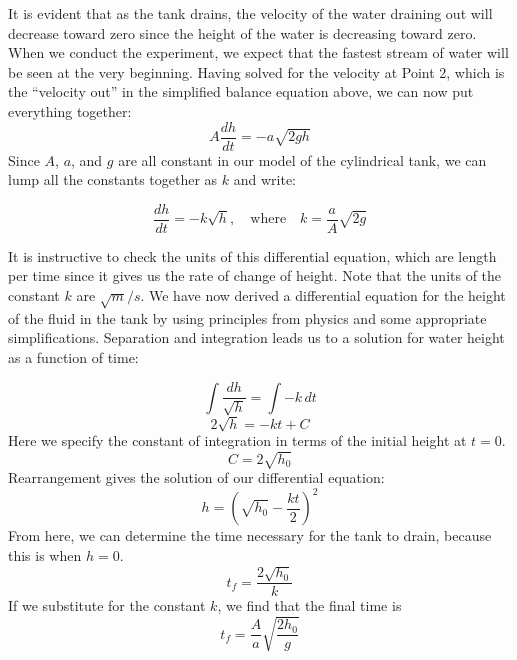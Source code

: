 \documentclass{ximera}
\begin{document}
 It is evident that as the tank drains, the velocity of the water draining out will decrease toward zero since the height of the water is decreasing toward zero.  When we conduct the experiment, we expect that the fastest stream of water will be seen at the very beginning.  Having solved for the velocity at Point 2, which is the “velocity out” in the simplified balance equation above, we can now put everything together:
 $$A\frac{dh}{dt}=-a\sqrt{2gh}$$
 Since $A$, $a$, and $g$ are all constant in our model of the cylindrical tank, we can lump all the constants together as $k$ and write:
 
 $$\frac{dh}{dt}=-k\sqrt{h},\quad \text{where}\quad k=\frac{a}{A}\sqrt{2g}$$

It is instructive to check the units of this differential equation, which are length per time since it gives us the rate of change of height.  Note that the units of the constant $k$ are $\sqrt{m}/s$.  We have now derived a differential equation for the height of the fluid in the tank by using principles from physics and some appropriate simplifications.  
Separation and integration leads us to a solution for water height as a function of time:

$$\int\frac{dh}{\sqrt{h}}=\int -k\,dt$$
$$2\sqrt{h}=-kt+C$$
Here we specify the constant of integration in terms of the initial height at $t=0$.
$$C=2\sqrt{h_0}$$
Rearrangement gives the solution of our differential equation:
$$h=\left(\sqrt{h_0}-\frac{kt}{2}\right)^2$$
From here, we can determine the time necessary for the tank to drain, because this is when $h=0$.
$$t_f=\frac{2\sqrt{h_0}}{k}$$
If we substitute for the constant $k$, we find that the final time is
$$t_f=\frac{A}{a}\sqrt{\frac{2h_0}{g}}$$
\end{document}
